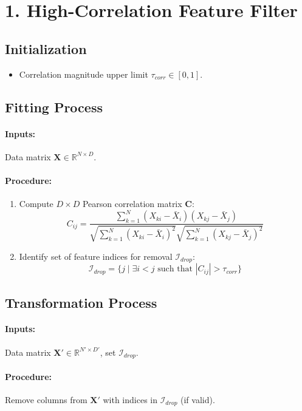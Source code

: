 \documentclass{article}
\newcommand{\mat}[1]{\mathbf{#1}} %
\begin{document}
\section*{1. High-Correlation Feature Filter}
\subsection*{Initialization}
\begin{itemize}
    \item Correlation magnitude upper limit $\tau_{corr} \in [0, 1]$.
\end{itemize}

\subsection*{Fitting Process}
\paragraph{Inputs:} Data matrix $\mat{X} \in \mathbb{R}^{N \times D}$.
\paragraph{Procedure:}
\begin{enumerate}
    \item Compute $D \times D$ Pearson correlation matrix $\mat{C}$:
    $$ C_{ij} = \frac{\sum_{k=1}^{N} (X_{ki} - \bar{X}_i)(X_{kj} - \bar{X}_j)}{\sqrt{\sum_{k=1}^{N} (X_{ki} - \bar{X}_i)^2} \sqrt{\sum_{k=1}^{N} (X_{kj} - \bar{X}_j)^2}} $$
    \item Identify set of feature indices for removal $\mathcal{I}_{drop}$:
    $$ \mathcal{I}_{drop} = \{ j \mid \exists i < j \text{ such that } |C_{ij}| > \tau_{corr} \} $$
\end{enumerate}

\subsection*{Transformation Process}
\paragraph{Inputs:} Data matrix $\mat{X}' \in \mathbb{R}^{N' \times D'}$, set $\mathcal{I}_{drop}$.
\paragraph{Procedure:} Remove columns from $\mat{X}'$ with indices in $\mathcal{I}_{drop}$ (if valid).
\end{document}
